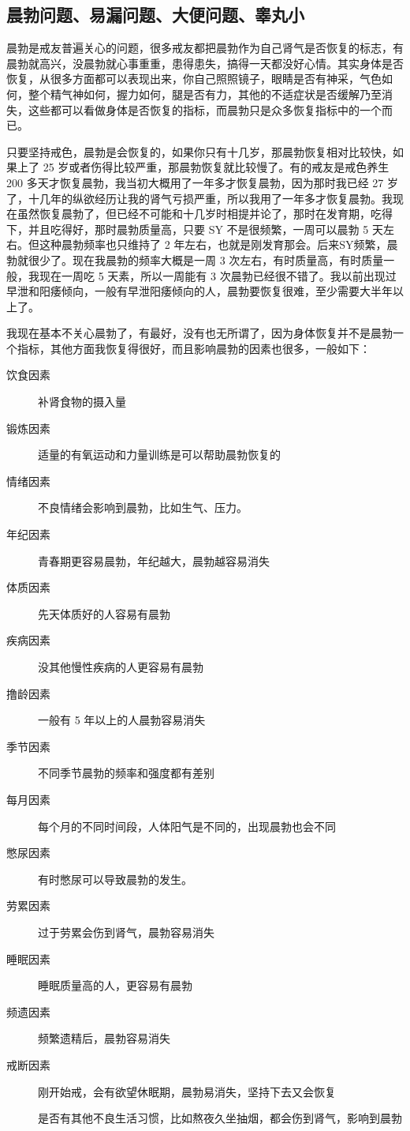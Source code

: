\documentclass[fontset=founder]{ctexart}
\begin{document}
\subsection{晨勃问题、易漏问题、大便问题、睾丸小}

晨勃是戒友普遍关心的问题，很多戒友都把晨勃作为自己肾气是否恢复的标志，有晨勃就高兴，没晨勃就心事重重，患得患失，搞得一天都没好心情。其实身体是否恢复，从很多方面都可以表现出来，你自己照照镜子，眼睛是否有神采，气色如何，整个精气神如何，握力如何，腿是否有力，其他的不适症状是否缓解乃至消失，这些都可以看做身体是否恢复的指标，而晨勃只是众多恢复指标中的一个而已。

只要坚持戒色，晨勃是会恢复的，如果你只有十几岁，那晨勃恢复相对比较快，如果上了 25 岁或者伤得比较严重，那晨勃恢复就比较慢了。有的戒友是戒色养生 200 多天才恢复晨勃，我当初大概用了一年多才恢复晨勃，因为那时我已经 27 岁了，十几年的纵欲经历让我的肾气亏损严重，所以我用了一年多才恢复晨勃。我现在虽然恢复晨勃了，但已经不可能和十几岁时相提并论了，那时在发育期，吃得下，并且吃得好，那时晨勃质量高，只要 SY 不是很频繁，一周可以晨勃 5 天左右。但这种晨勃频率也只维持了 2 年左右，也就是刚发育那会。后来SY频繁，晨勃就很少了。现在我晨勃的频率大概是一周 3 次左右，有时质量高，有时质量一般，我现在一周吃 5 天素，所以一周能有 3 次晨勃已经很不错了。我以前出现过早泄和阳痿倾向，一般有早泄阳痿倾向的人，晨勃要恢复很难，至少需要大半年以上了。

我现在基本不关心晨勃了，有最好，没有也无所谓了，因为身体恢复并不是晨勃一个指标，其他方面我恢复得很好，而且影响晨勃的因素也很多，一般如下：

\begin{description}
    \item[饮食因素] 补肾食物的摄入量
    \item[锻炼因素] 适量的有氧运动和力量训练是可以帮助晨勃恢复的
    \item[情绪因素] 不良情绪会影响到晨勃，比如生气、压力。
    \item[年纪因素] 青春期更容易晨勃，年纪越大，晨勃越容易消失
    \item[体质因素] 先天体质好的人容易有晨勃
    \item[疾病因素] 没其他慢性疾病的人更容易有晨勃
    \item[撸龄因素] 一般有 5 年以上的人晨勃容易消失
    \item[季节因素] 不同季节晨勃的频率和强度都有差别
    \item[每月因素] 每个月的不同时间段，人体阳气是不同的，出现晨勃也会不同
    \item[憋尿因素] 有时憋尿可以导致晨勃的发生。
    \item[劳累因素] 过于劳累会伤到肾气，晨勃容易消失
    \item[睡眠因素] 睡眠质量高的人，更容易有晨勃
    \item[频遗因素] 频繁遗精后，晨勃容易消失
    \item[戒断因素] 刚开始戒，会有欲望休眠期，晨勃易消失，坚持下去又会恢复
    \item[] 是否有其他不良生活习惯，比如熬夜久坐抽烟，都会伤到肾气，影响到晨勃
\end{description}
\end{document}
